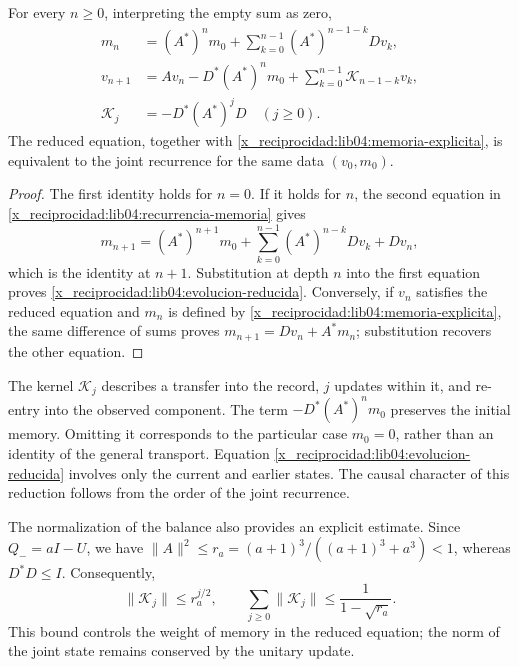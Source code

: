 \begin{proposition}
\label{x_reciprocidad:lib04:prop-memoria-reducida}
For every \(n\geq0\), interpreting the empty sum as zero,
\begin{align}
 m_n&=(A^*)^n m_0+
       \sum_{k=0}^{n-1}(A^*)^{n-1-k}Dv_k,
       \label{x_reciprocidad:lib04:memoria-explicita}\\
 v_{n+1}&=Av_n-D^*(A^*)^n m_0
       +\sum_{k=0}^{n-1}\mathscr K_{n-1-k}v_k,
       \label{x_reciprocidad:lib04:evolucion-reducida}\\
 \mathscr K_j&=-D^*(A^*)^jD\quad(j\geq0).
       \label{x_reciprocidad:lib04:nucleo-retardo}
\end{align}
The reduced equation, together with \eqref{x_reciprocidad:lib04:memoria-explicita}, is
equivalent to the joint recurrence for the same data \((v_0,m_0)\).
\end{proposition}
\begin{proof}
The first identity holds for \(n=0\). If it holds for \(n\), the second
equation in \eqref{x_reciprocidad:lib04:recurrencia-memoria} gives
\[
 m_{n+1}=(A^*)^{n+1}m_0+
 \sum_{k=0}^{n-1}(A^*)^{n-k}Dv_k+Dv_n,
\]
which is the identity at \(n+1\). Substitution at depth \(n\) into the
first equation proves \eqref{x_reciprocidad:lib04:evolucion-reducida}. Conversely, if
\(v_n\) satisfies the reduced equation and \(m_n\) is defined by
\eqref{x_reciprocidad:lib04:memoria-explicita}, the same difference of sums proves
\(m_{n+1}=Dv_n+A^*m_n\); substitution recovers the other equation.
\end{proof}

The kernel \(\mathscr K_j\) describes a transfer into the record,
\(j\) updates within it, and re-entry into the observed component.
The term \(-D^*(A^*)^nm_0\) preserves the initial memory. Omitting it
corresponds to the particular case \(m_0=0\), rather than an identity of
the general transport. Equation \eqref{x_reciprocidad:lib04:evolucion-reducida} involves
only the current and earlier states. The causal character of this reduction
follows from the order of the joint recurrence.

The normalization of the balance also provides an explicit estimate.
Since \(Q_-=aI-U\), we have
\(\|A\|^2\leq r_a=(a+1)^3/((a+1)^3+a^3)<1\), whereas
\(D^*D\leq I\). Consequently,
\begin{equation}
 \|\mathscr K_j\|\leq r_a^{j/2},\qquad
 \sum_{j\geq0}\|\mathscr K_j\|
 \leq\frac{1}{1-\sqrt{r_a}}.
 \label{x_reciprocidad:lib04:cota-nucleo-retardo}
\end{equation}
This bound controls the weight of memory in the reduced equation; the norm
of the joint state remains conserved by the unitary update.

